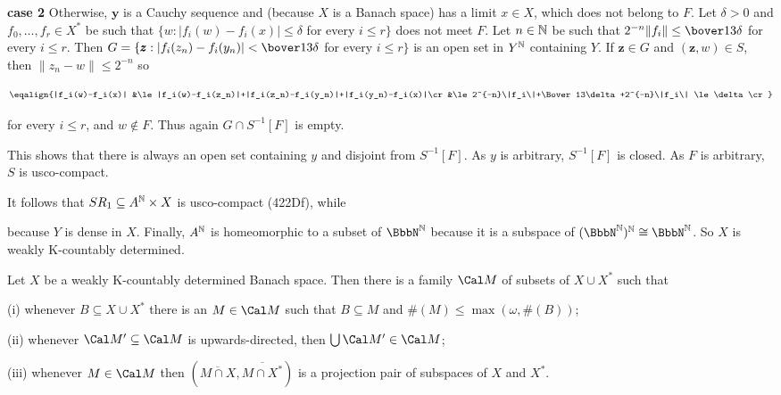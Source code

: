 {{\bf case 2} Otherwise, $\pmb{y}$ is a Cauchy sequence and (because $X$
is a Banach space) has a limit $x\in X$, which does not belong to $F$.
Let $\delta>0$ and $f_0,\ldots,f_r\in X^*$ be such that
$\{w:|f_i(w)-f_i(x)|\le\delta$ for every $i\le r\}$ does not meet $F$.
Let $n\in\Bbb N$ be such that $2^{-n}\|f_i\|\le\bover13\delta$ for every
$i\le r$.   Then $G=\{\pmb{z}:|f_i(z_n)-f_i(y_n)|<\bover13\delta$ for
every $i\le r\}$ is an open set in $Y^{\Bbb N}$ containing $Y$.   If
$\pmb{z}\in G$ and $(\pmb{z},w)\in S$, then $\|z_n-w\|\le 2^{-n}$ so

$$\eqalign{|f_i(w)-f_i(x)|
&\le|f_i(w)-f_i(z_n)|+|f_i(z_n)-f_i(y_n)|+|f_i(y_n)-f_i(x)|\cr
&\le 2^{-n}\|f_i\|+\Bover13\delta+2^{-n}\|f_i\|
\le\delta\cr}$$

\noindent for every $i\le r$, and $w\notin F$.   Thus again
$G\cap S^{-1}[F]$ is empty.

This shows that there is always an open set containing $y$ and disjoint
from $S^{-1}[F]$.   As $y$ is arbitrary, $S^{-1}[F]$ is closed.   As $F$
is arbitrary, $S$ is usco-compact.\ \Qed

It follows that $SR_1\subseteq A^{\Bbb N}\times X$ is usco-compact
(422Df), while


\noindent because $Y$ is dense in $X$.   Finally, $A^{\Bbb N}$ is
homeomorphic to a subset of $\NN$ because it is a subspace of
$(\NN)^{\Bbb N}\cong\NN$.   So $X$ is weakly K-countably determined.
}%

Let $X$ be a weakly K-countably determined Banach
space.   Then there is a family $\Cal M$ of subsets of $X\cup X^*$ such
that

(i) whenever $B\subseteq X\cup X^*$ there is an $M\in\Cal M$ such that
$B\subseteq M$ and $\#(M)\le\max(\omega,\#(B))$;

(ii) whenever $\Cal M'\subseteq\Cal M$ is upwards-directed, then
$\bigcup\Cal M'\in\Cal M$;

(iii) whenever $M\in\Cal M$ then
$(\overline{M\cap X},\overline{M\cap X^*})$ is a projection pair of subspaces of
$X$ and $X^*$.

